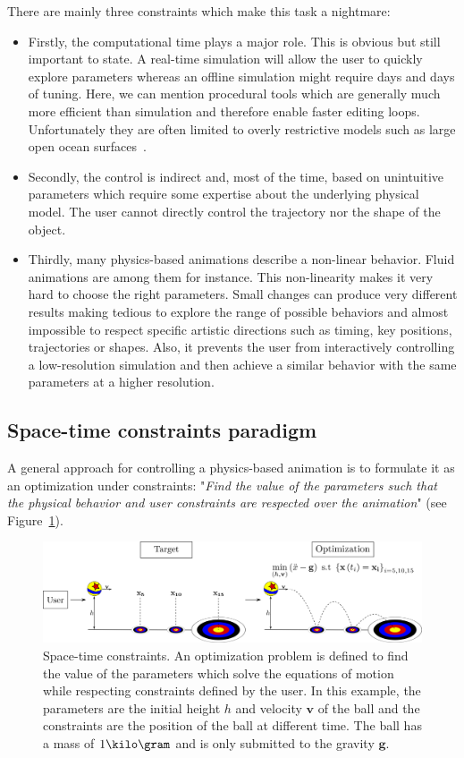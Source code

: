 There are mainly three constraints which make this task a nightmare:
\begin{itemize}
	\item Firstly, the computational time plays a major role. 
	This is obvious but still important to state. 
	A real-time simulation will allow the user to quickly explore parameters whereas an offline simulation might require days and days of tuning.
    Here, we can mention procedural tools which are generally much more efficient than simulation and therefore enable faster editing loops. Unfortunately they are often limited to overly restrictive models such as large open ocean surfaces~\cite{hinsinger2002,Tessendorf2004,jeschke2015water,horvath2015empirical}.
	\item Secondly, the control is indirect and, most of the time, based on unintuitive parameters which require some expertise about the underlying physical model. The user cannot directly control the trajectory nor the shape of the object.
	\item Thirdly, many physics-based animations describe a non-linear behavior. Fluid animations are among them for instance. 
	This non-linearity makes it very hard to choose the right parameters. 
	Small changes can produce very different results making tedious to explore the range of possible behaviors and almost impossible to respect specific artistic directions such as timing, key positions, trajectories or shapes. 
	Also, it prevents the user from interactively controlling a low-resolution simulation and then achieve a similar behavior with the same parameters at a higher resolution.
\end{itemize}

\subsection{Space-time constraints paradigm}
A general approach for controlling a physics-based animation is to formulate it as an optimization under constraints: 
"\emph{Find the value of the parameters such that the physical behavior and user constraints are respected over the animation}" 
(see Figure~\ref{fig:spaceTimeConstraints}).
\begin{figure}[!h]
\centering
\includegraphics[width=\linewidth]{./images/simulationControl/spaceTimeConstraints.png}
\caption[STAR control: Space-time constraints]{\label{fig:spaceTimeConstraints} Space-time constraints. 
An optimization problem is defined to find the value of the parameters which solve the equations of motion while respecting constraints defined by the user.
In this example, the parameters are the initial height $h$ and velocity $\mathbf{v}$ of the ball and the constraints are the position of the ball at different time.
The ball has a mass of $1\kilo\gram$ and is only submitted to the gravity $\mathbf{g}$.}
\end{figure}

